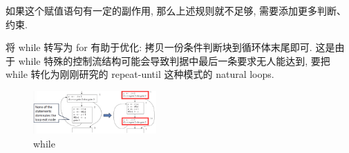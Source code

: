 如果这个赋值语句有一定的副作用, 那么上述规则就不足够, 需要添加更多判断、约束. 

将 while 转写为 for 有助于优化: 拷贝一份条件判断块到循环体末尾即可. 这是由于 while 特殊的控制流结构可能会导致判据中最后一条要求无人能达到, 要把 while 转化为刚刚研究的 repeat-until 这种模式的 natural loops.

\begin{figure}[!htb]
    \centering
    \includegraphics[width=0.42\textwidth]{pic/CP18/while}
    \caption{while}
\end{figure}


